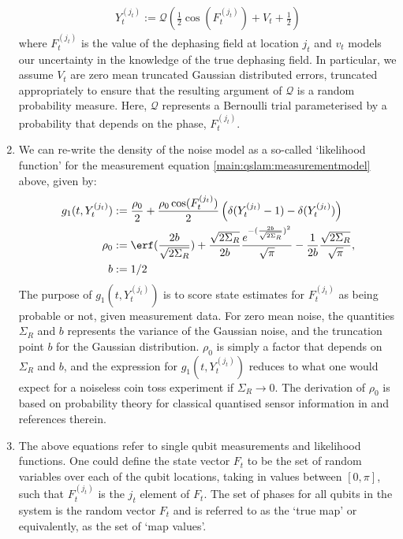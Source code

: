 \begin{enumerate}
		\begin{align}
		Y_t^{(j_t)} := \mathcal{Q}(\frac{1}{2} \cos(F_t^{(j_t)}) + V_t + \frac{1}{2}) \label{main:qslam:measurementmodel}
		\end{align} where $F_t^{(j_t)}$ is the value of the dephasing field at location $j_t$ and $v_t$ models our uncertainty in  the knowledge of the true dephasing field. In particular, we assume $V_t$ are zero mean truncated Gaussian distributed errors, truncated appropriately to ensure that the resulting argument of $\mathcal{Q}$ is  a random probability measure. Here, $\mathcal{Q}$ represents a Bernoulli trial parameterised by a probability that depends on the phase,  $F_t^{(j_t)}$.
	\item We can re-write the density of the noise model as a so-called `likelihood function' for the measurement equation \cref{main:qslam:measurementmodel} above, given by:
	\begin{align}
	g_1(t, Y_t^{(j_t)}) & :=  \frac{\rho_0}{2} + \frac{\rho_0  \cos(F_t^{(j_t)}) }{2} \left( \delta(Y_t^{(j_t)} - 1) - \delta(Y_t^{(j_t)}) \right) \label{main:qslam:likelihood:g1:func} \\
	\rho_0 &: =  \erf(\frac{2b}{\sqrt{2\Sigma_R}}) + \frac{\sqrt{2\Sigma_R}}{2b} \frac{e^{-(\frac{2b}{\sqrt{2\Sigma_R}})^2}}{\sqrt{\pi}}  - \frac{1}{2b}\frac{\sqrt{2\Sigma_R}}{\sqrt{\pi}},\\
	b &:= 1/2 \label{main:qslam:likelihood:g1:rho0}
	\end{align} The purpose of $g_1(t, Y_t^{(j_t)})$ is to score state estimates for $F_t^{(j_t)}$ as being probable or not, given measurement data. For zero mean noise, the quantities $\Sigma_R$ and $b$  represents the variance of the Gaussian noise, and the truncation point $b$ for the Gaussian distribution. $\rho_0$ is simply a factor that depends on $\Sigma_R$ and $b$, and the expression for   $g_1(t, Y_t^{(j_t)})$   reduces to what one would expect for a noiseless coin toss experiment if $\Sigma_R \to 0$. The derivation of $\rho_0$ is based on probability theory for classical quantised sensor information in \cite{riddhinotes} and references therein.  
	\item  The above equations refer to single qubit measurements and likelihood functions. One could define the state vector $F_t$ to be the set of random variables over each of the qubit locations, taking in values between $[0, \pi]$, such that $F_t^{(j_t)}$ is the $j_t$ element of $F_t$. The set of phases for all qubits in the system is the random vector $F_t$ and is referred to as the `true map' or equivalently, as the set of `map values'. 

\end{enumerate}
